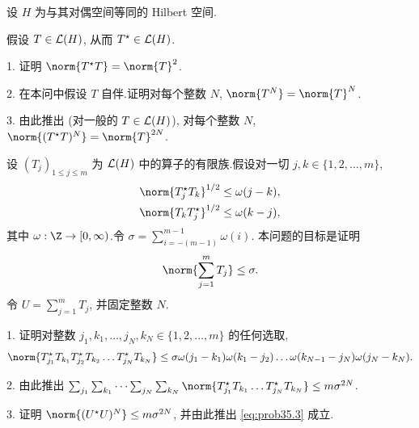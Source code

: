 \begin{problem}
\label{prob:35}
设 $H$ 为与其对偶空间等同的 Hilbert 空间.


假设 $T\in\mathcal{L}(H)$, 从而 $T^\star\in\mathcal{L}(H)$.

1. 证明 $\norm{T^\star T}=\norm{T}^2$.

2. 在本问中假设 $T$ 自伴.证明对每个整数 $N$, $\norm{T^N}=\norm{T}^N$.

3. 由此推出 (对一般的 $T\in\mathcal{L}(H)$), 对每个整数 $N$, $\norm{(T^\star T)^N}=\norm{T}^{2N}$.


设 $(T_j)_{1\le j\le m}$ 为 $\mathcal{L}(H)$ 中的算子的有限族.假设对一切 $j,k\in\{1,2,\dots,m\}$,
\begin{align}
\norm{T_j^\star T_k}^{1/2}&\le\omega(j-k), \label{eq:prob35.1}\\
\norm{T_kT_j^\star}^{1/2}&\le\omega(k-j), \label{eq:prob35.2}
\end{align}
其中 $\omega:\Z\to[0,\infty)$.令 $\sigma=\sum_{i=-(m-1)}^{m-1}\omega(i)$.
本问题的目标是证明
\begin{equation}
\norm{\sum_{j=1}^m T_j}\le\sigma.
\label{eq:prob35.3}
\end{equation}
令 $U=\sum_{j=1}^mT_j$, 并固定整数 $N$.

1. 证明对整数 $j_1,k_1,\dots,j_N,k_N\in\{1,2,\dots,m\}$ 的任何选取,
\begin{equation*}
\norm{T_{j_1}^\star T_{k_1}T_{j_2}^\star T_{k_2}\dots T_{j_N}^\star T_{k_N}}
\le\sigma\omega(j_1-k_1)\omega(k_1-j_2)\dots\omega(k_{N-1}-j_N)\omega(j_N-k_N).
\end{equation*}

2. 由此推出 $\sum_{j_1}\sum_{k_1}\dots\sum_{j_N}\sum_{k_N}\norm{T_{j_1}^\star T_{k_1}\dots T_{j_N}^\star T_{k_N}}\le m\sigma^{2N}$.

3. 证明 $\norm{(U^\star U)^N}\le m\sigma^{2N}$, 并由此推出 \eqref{eq:prob35.3} 成立.
\end{problem}
